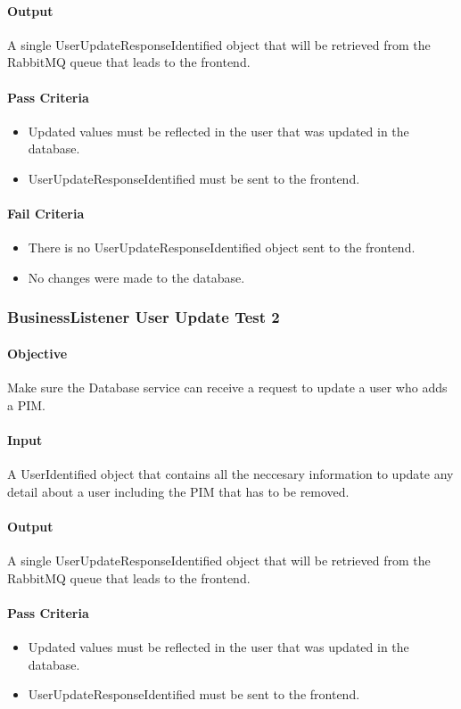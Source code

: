 \documentclass[hidelinks,english]{article}
\begin{document}
				\paragraph{Output} A single UserUpdateResponseIdentified object that will be retrieved from the RabbitMQ queue that leads to the frontend.
				\paragraph{Pass Criteria}
				\begin{itemize}
					\item Updated values must be reflected in the user that was updated in the database.
					\item UserUpdateResponseIdentified must be sent to the frontend.
				\end{itemize}
				\paragraph{Fail Criteria}
				\begin{itemize}
					\item There is no UserUpdateResponseIdentified object sent to the frontend.
					\item No changes were made to the database.
				\end{itemize}
				
				\subsubsection{BusinessListener User Update Test 2}\label{databasebusinesslistenerupdatetest2}
				\paragraph{Objective} Make sure the Database service can receive a request to update a user who adds a PIM.
				\paragraph{Input} A UserIdentified object that contains all the neccesary information to update any detail about a user including the PIM that has to be removed.
				\paragraph{Output} A single UserUpdateResponseIdentified object that will be retrieved from the RabbitMQ queue that leads to the frontend.
				\paragraph{Pass Criteria}
				\begin{itemize}
					\item Updated values must be reflected in the user that was updated in the database.
					\item UserUpdateResponseIdentified must be sent to the frontend.
				\end{itemize}
\end{document}
